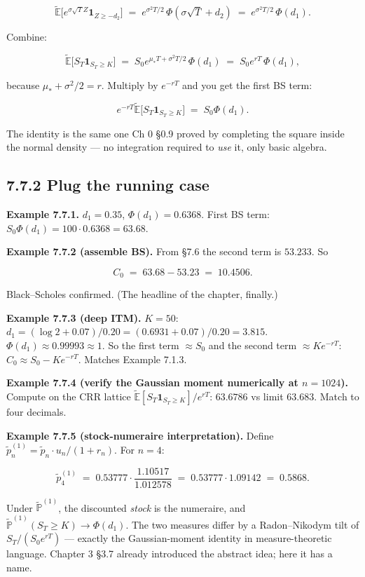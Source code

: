 \documentclass[
  10pt,
  twoside]{book}
\begin{document}
\[\tilde{\mathbb E}\bigl[e^{\sigma\sqrt T Z}\mathbf 1_{Z \ge -d_2}\bigr] \;=\; e^{\sigma^2 T/2}\,\Phi(\sigma\sqrt T + d_2) \;=\; e^{\sigma^2 T/2}\,\Phi(d_1).\]

Combine:

\[\tilde{\mathbb E}\bigl[S_T \mathbf 1_{S_T \ge K}\bigr] \;=\; S_0 e^{\mu_* T + \sigma^2 T/2}\,\Phi(d_1) \;=\; S_0 e^{rT}\,\Phi(d_1),\]

because \(\mu_* + \sigma^2/2 = r\). Multiply by \(e^{-rT}\) and you get
the first BS term:

\[e^{-rT}\tilde{\mathbb E}\bigl[S_T \mathbf 1_{S_T \ge K}\bigr] \;=\; S_0\Phi(d_1).\]

The identity is the same one Ch 0 §0.9 proved by completing the square
inside the normal density --- no integration required to \emph{use} it,
only basic algebra.

\subsection{7.7.2 Plug the running case}\label{plug-the-running-case-1}

\textbf{Example 7.7.1.} \(d_1 = 0.35\), \(\Phi(d_1) = 0.6368\). First BS
term: \(S_0\Phi(d_1) = 100 \cdot 0.6368 = 63.68\).

\textbf{Example 7.7.2 (assemble BS).} From §7.6 the second term is
\(53.233\). So

\[C_0 \;=\; 63.68 - 53.23 \;=\; 10.4506.\]

Black--Scholes confirmed. (The headline of the chapter, finally.)

\textbf{Example 7.7.3 (deep ITM).} \(K = 50\):
\(d_1 = (\log 2 + 0.07)/0.20 = (0.6931 + 0.07)/0.20 = 3.815\).
\(\Phi(d_1) \approx 0.99993 \approx 1\). So the first term
\(\approx S_0\) and the second term \(\approx K e^{-rT}\):
\(C_0 \approx S_0 - K e^{-rT}\). Matches Example 7.1.3.

\textbf{Example 7.7.4 (verify the Gaussian moment numerically at
\(n = 1024\)).} Compute on the CRR lattice
\(\tilde{\mathbb E}[S_T\mathbf 1_{S_T \ge K}]/e^{rT}\): \(63.6786\) vs
limit \(63.683\). Match to four decimals.

\textbf{Example 7.7.5 (stock-numeraire interpretation).} Define
\(\tilde p^{(1)}_n = \tilde p_n \cdot u_n / (1 + r_n)\). For \(n = 4\):

\[\tilde p^{(1)}_4 \;=\; 0.53777 \cdot \frac{1.10517}{1.012578} \;=\; 0.53777 \cdot 1.09142 \;=\; 0.5868.\]

Under \(\tilde{\mathbb P}^{(1)}\), the discounted \emph{stock} is the
numeraire, and \(\tilde{\mathbb P}^{(1)}(S_T \ge K) \to \Phi(d_1)\). The
two measures differ by a Radon--Nikodym tilt of \(S_T/(S_0 e^{rT})\) ---
exactly the Gaussian-moment identity in measure-theoretic language.
Chapter 3 §3.7 already introduced the abstract idea; here it has a name.
\end{document}
